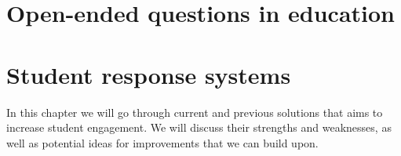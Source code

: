 \section{Open-ended questions in education}




\section{Student response systems}
In this chapter we will go through current and previous solutions that aims to increase student engagement. We will discuss their strengths and weaknesses, as well as potential ideas for improvements that we can build upon.

